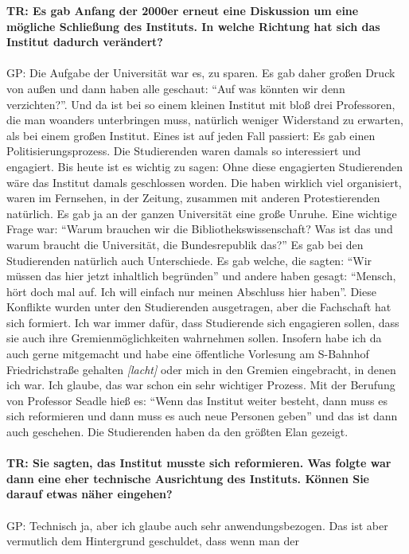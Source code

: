 \documentclass[a4paper,
fontsize=11pt,
oneside,
numbers=noperiodatend,
parskip=half-,
bibliography=totoc,
final
]{scrartcl}
\begin{document}
\textbf{TR: Es gab Anfang der 2000er erneut eine Diskussion um eine
mögliche Schließung des Instituts. In welche Richtung hat sich das
Institut dadurch verändert?\\
}~\\
GP: Die Aufgabe der Universität war es, zu sparen. Es gab daher großen
Druck von außen und dann haben alle geschaut: \enquote{Auf was könnten
wir denn verzichten?}. Und da ist bei so einem kleinen Institut mit bloß
drei Professoren, die man woanders unterbringen muss, natürlich weniger
Widerstand zu erwarten, als bei einem großen Institut. Eines ist auf
jeden Fall passiert: Es gab einen Politisierungsprozess. Die
Studierenden waren damals so interessiert und engagiert. Bis heute ist
es wichtig zu sagen: Ohne diese engagierten Studierenden wäre das
Institut damals geschlossen worden. Die haben wirklich viel organisiert,
waren im Fernsehen, in der Zeitung, zusammen mit anderen Protestierenden
natürlich. Es gab ja an der ganzen Universität eine große Unruhe. Eine
wichtige Frage war: \enquote{Warum brauchen wir die
Bibliothekswissenschaft? Was ist das und warum braucht die Universität,
die Bundesrepublik das?} Es gab bei den Studierenden natürlich auch
Unterschiede. Es gab welche, die sagten: \enquote{Wir müssen das hier
jetzt inhaltlich begründen} und andere haben gesagt: \enquote{Mensch,
hört doch mal auf. Ich will einfach nur meinen Abschluss hier haben}.
Diese Konflikte wurden unter den Studierenden ausgetragen, aber die
Fachschaft hat sich formiert. Ich war immer dafür, dass Studierende sich
engagieren sollen, dass sie auch ihre Gremienmöglichkeiten wahrnehmen
sollen. Insofern habe ich da auch gerne mitgemacht und habe eine
öffentliche Vorlesung am S-Bahnhof Friedrichstraße gehalten
\emph{{[}lacht{]}} oder mich in den Gremien eingebracht, in denen ich
war. Ich glaube, das war schon ein sehr wichtiger Prozess. Mit der
Berufung von Professor Seadle hieß es: \enquote{Wenn das Institut weiter
besteht, dann muss es sich reformieren und dann muss es auch neue
Personen geben} und das ist dann auch geschehen. Die Studierenden haben
da den größten Elan gezeigt.\\
~\\
\textbf{TR: Sie sagten, das Institut musste sich reformieren. Was folgte
war dann eine eher technische Ausrichtung des Instituts. Können Sie
darauf etwas näher eingehen?\\
}~\\
GP: Technisch ja, aber ich glaube auch sehr anwendungsbezogen. Das ist
aber vermutlich dem Hintergrund geschuldet, dass wenn man der
\end{document}
